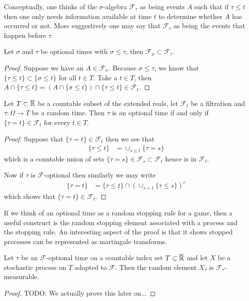 Conceptually, one thinks of the $\sigma$-algebra $\mathcal{F}_\tau$ as being
events $A$ such that if $\tau \leq t$ then one only needs information
available at time $t$ to determine whether $A$ has occurred or not.
More suggestively one may say that $\mathcal{F}_\tau$ as being the
events that happen before $\tau$.

\begin{lem}\label{StoppedFiltrationContainment}Let $\sigma$ and $\tau$ be optional times with $\sigma \leq
  \tau$, then $\mathcal{F}_\sigma \subset \mathcal{F}_\tau$.
 \end{lem}
\begin{proof}Suppose we have an $A \in \mathcal{F}_\sigma$.  Because
  $\sigma \leq \tau$, we know that$\lbrace \tau \leq t
  \rbrace \subset \lbrace \sigma \leq t \rbrace$  for all $t \in T$.  Take a 
  $t \in T$, then $A \cap \lbrace \tau \leq t \rbrace = (A \cap
  \lbrace \sigma \leq t \rbrace) \cap \lbrace \tau \leq t \rbrace \in \mathcal{F}_t$.
\end{proof}

\begin{lem}Let $T \subset \overline{\mathbb{R}}$ be a countable subset of
  the extended reals, let $\mathcal{F}_t$ be a filtration and $\tau :
  \Omega \to T$ be a random time.  Then $\tau$ is an optional time if
  and only if $\lbrace \tau = t \rbrace \in \mathcal{F}_t$ for every
  $t \in T$.
\end{lem}
\begin{proof}
Suppose that $\lbrace \tau = t \rbrace \in \mathcal{F}_t$ then we see
that 
\begin{align*}
\lbrace \tau \leq t \rbrace &= \cup_{s \leq t} \lbrace \tau = s \rbrace
\end{align*}
which is a countable union of sets $\lbrace \tau = s \rbrace \in
\mathcal{F}_s \subset \mathcal{F}_t$ hence is in $\mathcal{F}_t$.

Now if $\tau$ is $\mathcal{F}$-optional then similarly we may write
\begin{align*}
\lbrace \tau = t \rbrace &= \lbrace \tau \leq t \rbrace \cap \left(
  \cup_{s < t} \lbrace \tau \leq s \rbrace\right )^c
\end{align*}
which shows that $\lbrace \tau = t \rbrace \in \mathcal{F}_t$.
\end{proof}

If we think of an optional time as a random stopping rule for a game, then a
useful construct is the random stopping element associated with a
process and the stopping rule.  An interesting aspect of the proof is
that it shows stopped processes can be represented as martingale transforms.
\begin{lem}Let $\tau$ be an $\mathcal{F}$-optional time on a countable index set $T
  \subset \overline{\mathbb{R}}$ and let $X$ be a stochastic
  process on $T$ adapted to $\mathcal{F}$. Then the random element $X_\tau$ is $\mathcal{F}_\tau$-measurable.
\end{lem}
\begin{proof}
TODO: We actually prove this later on...
\end{proof}

